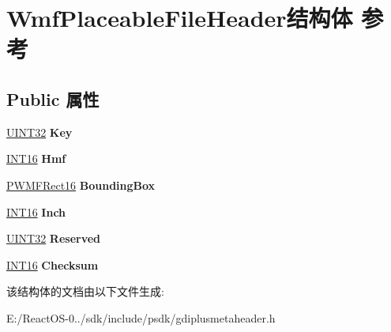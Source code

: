 \hypertarget{struct_wmf_placeable_file_header}{}\section{Wmf\+Placeable\+File\+Header结构体 参考}
\label{struct_wmf_placeable_file_header}
\subsection*{Public 属性}
\begin{DoxyCompactItemize}
\item 
\mbox{\label{struct_wmf_placeable_file_header_a184c64f603b62259422f45897c283bc0}} 
\hyperlink{_processor_bind_8h_ae1e6edbbc26d6fbc71a90190d0266018}{U\+I\+N\+T32} {\bfseries Key}
\item 
\mbox{\label{struct_wmf_placeable_file_header_a183106c1b7c4ee61d30f87777507fa2b}} 
\hyperlink{_processor_bind_8h_a30f500129d8c688af07726d5d34ce52d}{I\+N\+T16} {\bfseries Hmf}
\item 
\mbox{\label{struct_wmf_placeable_file_header_ac564930e5b2cc0198630c0e84a2ca16e}} 
\hyperlink{struct_p_w_m_f_rect16}{P\+W\+M\+F\+Rect16} {\bfseries Bounding\+Box}
\item 
\mbox{\label{struct_wmf_placeable_file_header_afe134d3d7b34d6b120109d14bff3abf0}} 
\hyperlink{_processor_bind_8h_a30f500129d8c688af07726d5d34ce52d}{I\+N\+T16} {\bfseries Inch}
\item 
\mbox{\label{struct_wmf_placeable_file_header_aa47a7550f6efa8f6595185e4bf5db025}} 
\hyperlink{_processor_bind_8h_ae1e6edbbc26d6fbc71a90190d0266018}{U\+I\+N\+T32} {\bfseries Reserved}
\item 
\mbox{\label{struct_wmf_placeable_file_header_aa318d290e0ec102de03917bd636fb8b3}} 
\hyperlink{_processor_bind_8h_a30f500129d8c688af07726d5d34ce52d}{I\+N\+T16} {\bfseries Checksum}
\end{DoxyCompactItemize}


该结构体的文档由以下文件生成\+:\begin{DoxyCompactItemize}
\item 
E\+:/\+React\+O\+S-\/0../sdk/include/psdk/gdiplusmetaheader.\+h\end{DoxyCompactItemize}
